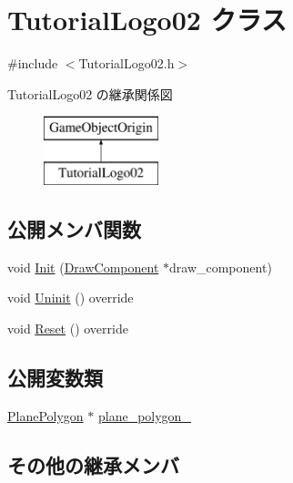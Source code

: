 \hypertarget{class_tutorial_logo02}{}\section{Tutorial\+Logo02 クラス}
\label{class_tutorial_logo02}


{\ttfamily \#include $<$Tutorial\+Logo02.\+h$>$}

Tutorial\+Logo02 の継承関係図\begin{figure}[H]
\begin{center}
\leavevmode
\includegraphics[height=2.000000cm]{class_tutorial_logo02}
\end{center}
\end{figure}
\subsection*{公開メンバ関数}
\begin{DoxyCompactItemize}
\item 
void \mbox{\hyperlink{class_tutorial_logo02_a1ed74182381f5a74b517519ff2248878}{Init}} (\mbox{\hyperlink{class_draw_component}{Draw\+Component}} $\ast$draw\+\_\+component)
\item 
void \mbox{\hyperlink{class_tutorial_logo02_ab9d0ac3888adf512c29fc0fe7f9beb4e}{Uninit}} () override
\item 
void \mbox{\hyperlink{class_tutorial_logo02_a73afa56b1e98736072745dc414ebd29f}{Reset}} () override
\end{DoxyCompactItemize}
\subsection*{公開変数類}
\begin{DoxyCompactItemize}
\item 
\mbox{\hyperlink{class_plane_polygon}{Plane\+Polygon}} $\ast$ \mbox{\hyperlink{class_tutorial_logo02_a4d43a653ba9425cade8a85acc5c299f8}{plane\+\_\+polygon\+\_\+}}
\end{DoxyCompactItemize}
\subsection*{その他の継承メンバ}


